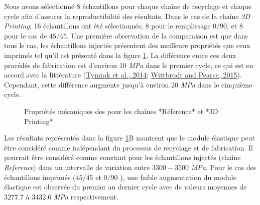 \documentclass[
]{article}
\begin{document}
Nous avons sélectionné 8 échantillons pour chaque chaîne de recyclage et chaque cycle afin d'assurer la reproductibilité des résultats.
Dans le cas de la chaîne \emph{3D Printing}, 16 échantillons ont été sélectionnés; 8 pour le remplissage \(0/90\), et 8 pour le cas de \(45/45\).
Une première observation de la comparaison est que dans tous le cas, les échantillons injectés présentent des meilleure propriétés que ceux imprimés tel qu'il est présenté dans la figure \ref{fig:Ref-3DP}.
La différence entre ces deux procédés de fabrication est d'environ 10 \emph{MPa} dans le premier cycle, ce qui est en accord avec la littérature (\protect\hyperlink{ref-Tymrak2014a}{Tymrak et al., 2014}; \protect\hyperlink{ref-Wittbrodt2015}{Wittbrodt and Pearce, 2015}).
Cependant, cette différence augmente jusqu'à environ 20 \emph{MPa} dans le cinquième cycle.

\begin{figure}

{\centering {}

}

\caption{Propriétés mécaniques des pour les chaînes *Réference* et *3D Printing*}\label{fig:Ref-3DP}
\end{figure}

Les résultats représentés dans la figure \ref{fig:Ref-3DP}B montrent que le module élastique peut être considéré comme indépendant du processus de recyclage et de fabrication.
Il pourrait être considéré comme constant pour les échantillons injectés (chaîne \emph{Reference}) dans un intervalle de variation entre \(3300-3500\) \emph{MPa}.
Pour le cas des échantillons imprimés (\(45/45\) et \(0/90\) ), une faible augmentation du module élastique est observée du premier au dernier cycle avec de valeurs moyennes de \(3277.7\) à \(3432.6\) \emph{MPa} respectivement.
\end{document}
